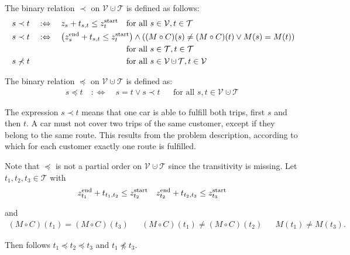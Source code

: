 \begin{definition}
\label{def:partial_order}

The binary relation $\prec$ on $\mathcal{V}\cupdot\mathcal{T}$ is defined as follows:
\begin{align*}
	& s\prec t \quad :\Leftrightarrow \quad z_s + t_{s,t} \leq \zstart_t && \text{for all } s\in\mathcal{V}, t\in\mathcal{T} \\	
	& \omit\rlap{$\displaystyle{s\prec t \quad :\Leftrightarrow \quad \left(\zend_s + t_{s,t} \leq \zstart_t\right)\land\left((M\circ C)(s)\neq (M\circ C)(t)\lor M(s)=M(t)\right)}$} \\
	&&& \text{for all } s\in\mathcal{T}, t\in\mathcal{T} \qquad\qquad\qquad\qquad\qquad\qquad \\
	& s\not\prec t && \text{for all } s\in\mathcal{V}\cupdot\mathcal{T}, t\in\mathcal{V}
\end{align*}

The binary relation $\preceq$ on $\mathcal{V}\cupdot\mathcal{T}$ is defined as:
\begin{align*}
	s\preceq t \quad :\Leftrightarrow \quad s=t \lor s\prec t && \text{for all } s,t\in\mathcal{V}\cupdot\mathcal{T}
\end{align*}

\end{definition}

The expression $s\prec t$ means that one car is able to fulfill both trips, first $s$ and then $t$. A car must not cover two trips of the same customer, except if they belong to the same route. This results from the problem description, according to which for each customer exactly one route is fulfilled. 

\begin{remark}

Note that $\preceq$ is not a partial order on $\mathcal{V}\cupdot\mathcal{T}$ since the transitivity is missing. Let $t_1,t_2,t_3\in\mathcal{T}$ with 
\begin{align*}
	z^{\operatorname{end}}_{t_1} + t_{t_1,t_2} \leq z^{\operatorname{start}}_{t_2} && z^{\operatorname{end}}_{t_2} + t_{t_2,t_3} \leq z^{\operatorname{start}}_{t_3}
\end{align*}

and
\begin{align*}
	(M\circ C)\left(t_1\right) = (M\circ C)\left(t_3\right) && (M\circ C)\left(t_1\right) \neq (M\circ C)\left(t_2\right) && M\left(t_1\right)\neq M\left(t_3\right).
\end{align*}

Then follows $t_1 \preceq t_2 \preceq t_3$ and $t_1 \not\preceq t_3$.

\end{remark}

